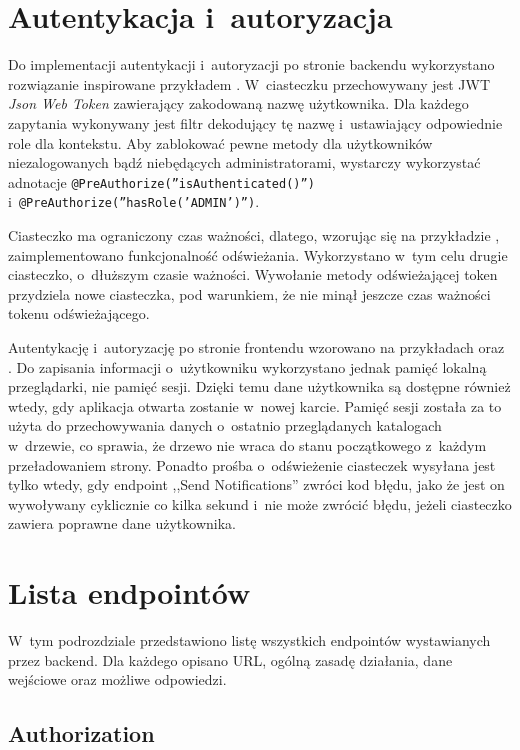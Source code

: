 \documentclass[a4paper,twoside,12pt]{book}
\newcommand{\obcy}[1]{\emph{#1}}
\newcommand{\english}[1]{{\selectlanguage{british}\obcy{#1}}}
\begin{document}
\section{Autentykacja i~autoryzacja}

Do implementacji autentykacji i~autoryzacji po stronie backendu wykorzystano rozwiązanie inspirowane przykładem \cite{bib:bkspringauth}. W~ciasteczku przechowywany jest JWT \english{Json Web Token} zawierający zakodowaną nazwę użytkownika. Dla każdego zapytania wykonywany jest filtr dekodujący tę nazwę i~ustawiający odpowiednie role dla kontekstu. Aby zablokować pewne metody dla użytkowników niezalogowanych bądź niebędących administratorami, wystarczy wykorzystać adnotacje  \texttt{@PreAuthorize(''isAuthenticated()'')} i~\texttt{@PreAuthorize(''hasRole('ADMIN')'')}. 

Ciasteczko ma ograniczony czas ważności, dlatego, wzorując się na przykładzie \cite{bib:bkspringrefresh}, zaimplementowano funkcjonalność odświeżania. Wykorzystano w~tym celu drugie ciasteczko, o~dłuższym czasie ważności. Wywołanie metody odświeżającej token przydziela nowe ciasteczka, pod warunkiem, że nie minął jeszcze czas ważności tokenu odświeżającego.

Autentykację i~autoryzację po stronie frontendu wzorowano na przykładach \cite{bib:bkangularauth} oraz \cite{bib:bkangularrefresh}. Do zapisania informacji o~użytkowniku wykorzystano jednak pamięć lokalną przeglądarki, nie pamięć sesji. Dzięki temu dane użytkownika są dostępne również wtedy, gdy aplikacja otwarta zostanie w~nowej karcie. Pamięć sesji została za to użyta do przechowywania danych o~ostatnio przeglądanych katalogach w~drzewie, co sprawia, że drzewo nie wraca do stanu początkowego z~każdym przeładowaniem strony. Ponadto prośba o~odświeżenie ciasteczek wysyłana jest tylko wtedy, gdy endpoint ,,Send Notifications'' zwróci kod błędu, jako że jest on wywoływany cyklicznie co kilka sekund i~nie może zwrócić błędu, jeżeli ciasteczko zawiera poprawne dane użytkownika.

\section{Lista endpointów}
\label{sec:lista-endpointow}
W~tym podrozdziale przedstawiono listę wszystkich endpointów wystawianych przez backend. Dla każdego opisano URL, ogólną zasadę działania, dane wejściowe oraz możliwe odpowiedzi.

\subsection{Authorization}
\end{document}
